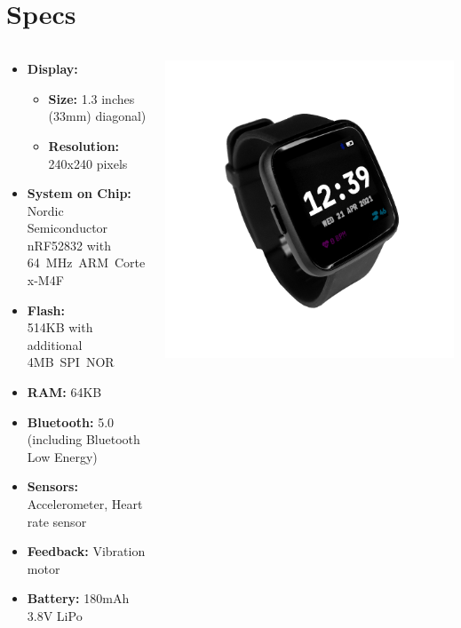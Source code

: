 \documentclass{beamer}
\begin{document}
\section{Specs}
\begin{frame}{}
  \begin{columns}
  \begin{column}{0.6\textwidth}

    \begin{itemize}
      \item \textbf{Display:}
      \begin{itemize}
        \item \textbf{Size:} 1.3 inches (33mm) diagonal)
        \item \textbf{Resolution:} 240x240 pixels
      \end{itemize}
      \item \textbf{System on Chip:}\\Nordic Semiconductor nRF52832 with 64~MHz~ARM~Cortex-M4F
      \item \textbf{Flash:}\\514KB with additional 4MB~SPI~NOR
      \item \textbf{RAM:} 64KB
      \item \textbf{Bluetooth:} 5.0\\(including Bluetooth Low Energy)
      \item \textbf{Sensors:}\\Accelerometer, Heart rate sensor
      \item \textbf{Feedback:} Vibration motor
      \item \textbf{Battery:} 180mAh 3.8V LiPo
    \end{itemize}
  \end{column}
  \begin{column}{0.5\textwidth}
    \includegraphics[width=\textwidth]{../pinetime-slider-v2}

\end{column}
\end{columns}
\end{frame}
\end{document}

